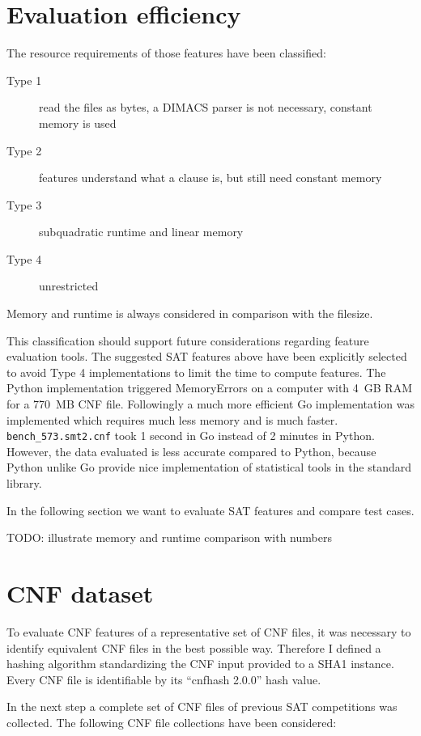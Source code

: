 \section{Evaluation efficiency}
\label{sec:features-efficiency}
%
The resource requirements of those features have been classified:
\begin{description}
  \item[Type 1] read the files as bytes, a DIMACS parser is not necessary, constant memory is used
  \item[Type 2] features understand what a clause is, but still need constant memory
  \item[Type 3] subquadratic runtime and linear memory
  \item[Type 4] unrestricted
\end{description}
%
Memory and runtime is always considered in comparison with the filesize.

This classification should support future considerations regarding feature evaluation tools.
The suggested SAT features above have been explicitly selected to avoid Type 4 implementations to limit the time to compute features.
The Python implementation triggered MemoryErrors on a computer with 4~GB RAM for a 770~MB CNF file.
Followingly a much more efficient Go implementation was implemented which requires much less memory and is much faster.
\texttt{bench\_573.smt2.cnf} took 1 second in Go instead of 2 minutes in Python.
However, the data evaluated is less accurate compared to Python, because Python unlike Go provide nice implementation of statistical tools in the standard library.

In the following section we want to evaluate SAT features and
compare test cases.

TODO: illustrate memory and runtime comparison with numbers

\section{CNF dataset}
\label{sec:features-dataset}
%
To evaluate CNF features of a representative set of CNF files, it was necessary to identify equivalent CNF files in the best possible way.
Therefore I defined a hashing algorithm standardizing the CNF input provided to a SHA1 instance. Every CNF file is identifiable by its
\enquote{cnfhash 2.0.0} hash value.

In the next step a complete set of CNF files of previous SAT competitions was collected.
The following CNF file collections have been considered:

